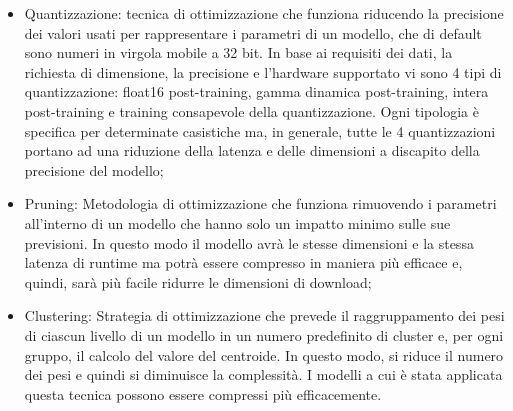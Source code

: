 \begin{itemize}
    \item Quantizzazione: tecnica di ottimizzazione che funziona riducendo la precisione dei valori usati per rappresentare i parametri di un modello,
    che di default sono numeri in virgola mobile a 32 bit. In base ai requisiti dei dati, la richiesta di dimensione, la precisione e l’hardware supportato vi
    sono 4 tipi di quantizzazione: float16 post-training, gamma dinamica post-training, intera post-training e training consapevole della quantizzazione.
    Ogni tipologia è specifica per determinate casistiche ma, in generale, tutte le 4 quantizzazioni portano ad una riduzione della latenza e delle
    dimensioni a discapito della precisione del modello;
    \item Pruning: Metodologia di ottimizzazione che funziona rimuovendo i parametri all’interno di un modello che hanno solo un impatto minimo sulle
    sue previsioni. In questo modo il modello avrà le stesse dimensioni e la stessa latenza di runtime ma potrà essere compresso in maniera più efficace
    e, quindi, sarà più facile ridurre le dimensioni di download;
    \item Clustering: Strategia di ottimizzazione che prevede il raggruppamento dei pesi di ciascun livello di un modello in un numero predefinito di
    cluster e, per ogni gruppo, il calcolo del valore del centroide. In questo modo, si riduce il numero dei pesi e quindi si diminuisce la complessità.
    I modelli a cui è stata applicata questa tecnica possono essere compressi più efficacemente.
\end{itemize}

